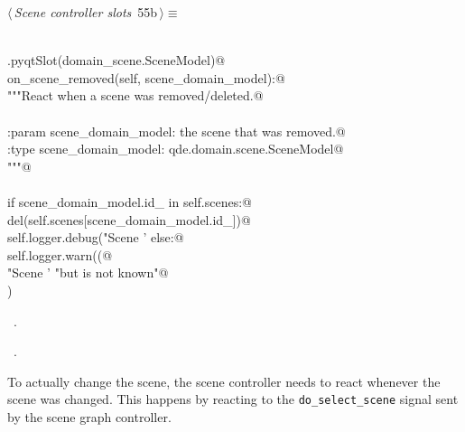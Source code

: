 \documentclass[
    a4paper,      %
    10pt,         %
    openright,    %
    notitlepage,  %
    parskip=half, %
]{scrreprt}       %
\theoremstyle{definition}                    %
\begin{document}
\begin{flushleft} \small
\begin{minipage}{\linewidth}\label{scrap85}\raggedright\small
{} $\langle\,${\itshape Scene controller slots}\nobreak\ {\footnotesize {55b}}$\,\rangle\equiv$
\vspace{-1exm}
\begin{list}{}{} \item
\mbox{}\lstinline@@\\
\mbox{}\lstinline@QtCore.pyqtSlot(domain_scene.SceneModel)@\\
\mbox{}\lstinline@def on_scene_removed(self, scene_domain_model):@\\
\mbox{}\lstinline@    """React when a scene was removed/deleted.@\\
\mbox{}\lstinline@@\\
\mbox{}\lstinline@    :param scene_domain_model: the scene that was removed.@\\
\mbox{}\lstinline@    :type scene_domain_model:  qde.domain.scene.SceneModel@\\
\mbox{}\lstinline@    """@\\
\mbox{}\lstinline@@\\
\mbox{}\lstinline@    if scene_domain_model.id_ in self.scenes:@\\
\mbox{}\lstinline@        del(self.scenes[scene_domain_model.id_])@\\
\mbox{}\lstinline@        self.logger.debug("Scene '%s' was removed" % scene_domain_model)@\\
\mbox{}\lstinline@    else:@\\
\mbox{}\lstinline@        self.logger.warn((@\\
\mbox{}\lstinline@            "Scene '%s' should be removed, "@\\
\mbox{}\lstinline@            "but is not known"@\\
\mbox{}\lstinline@        ) % scene_domain_model)@\\
\mbox{}\lstinline@@{\NWsep}
\end{list}
\vspace{-1.5ex}
\footnotesize
\begin{list}{}{\setlength{\itemsep}{-\parsep}\setlength{\itemindent}{-\leftmargin}}
\item \NWtxtMacroDefBy\ .
\item \NWtxtMacroRefIn\ .

\item{}
\end{list}
\end{minipage}\vspace{4ex}
\end{flushleft}
To actually change the scene, the scene controller needs to react whenever the
scene was changed. This happens by reacting to the \verb+do_select_scene+
signal sent by the scene graph controller.
\end{document}
